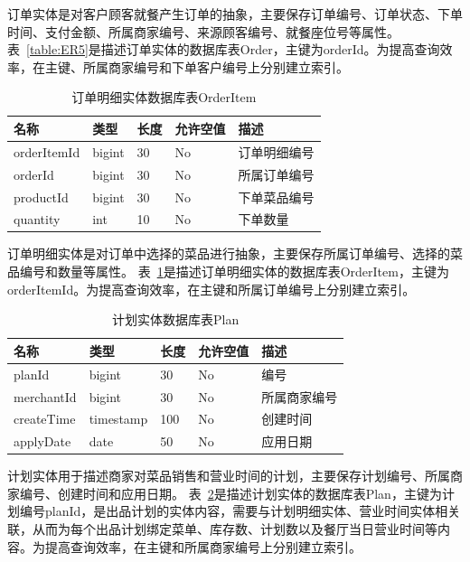 订单实体是对客户顾客就餐产生订单的抽象，主要保存订单编号、订单状态、下单时间、支付金额、所属商家编号、来源顾客编号、就餐座位号等属性。
表~\ref{table:ER5}是描述订单实体的数据库表Order，主键为orderId。为提高查询效率，在主键、所属商家编号和下单客户编号上分别建立索引。

\begin{table}[htbp!]\footnotesize
  \centering
  \caption{订单明细实体数据库表OrderItem}
  \vspace{2mm}
  \begin{tabular}{lllll}
  \toprule
  \textbf{名称}&\textbf{类型}&\textbf{长度}&\textbf{允许空值}&\textbf{描述}\\
  \midrule 
  orderItemId& bigint& 30& No& 订单明细编号\\
  \hline
  orderId& bigint& 30& No& 所属订单编号\\
  \hline
  productId& bigint& 30& No& 下单菜品编号\\
  \hline
  quantity& int& 10& No& 下单数量\\
  \bottomrule
  \end{tabular}
  \label{table:ER6}
\end{table}

订单明细实体是对订单中选择的菜品进行抽象，主要保存所属订单编号、选择的菜品编号和数量等属性。
表~\ref{table:ER6}是描述订单明细实体的数据库表OrderItem，主键为orderItemId。为提高查询效率，在主键和所属订单编号上分别建立索引。

\begin{table}[htbp!]\footnotesize
  \centering
  \caption{计划实体数据库表Plan}
  \vspace{2mm}
  \begin{tabular}{lllll}
  \toprule
  \textbf{名称}&\textbf{类型}&\textbf{长度}&\textbf{允许空值}&\textbf{描述}\\
  \midrule 
  planId& bigint& 30& No& 编号\\
  \hline
  merchantId& bigint& 30& No& 所属商家编号\\
  \hline
  createTime& timestamp& 100& No& 创建时间\\
  \hline
  applyDate& date& 50& No& 应用日期\\
  \bottomrule
  \end{tabular}
  \label{table:ER7}
\end{table}

计划实体用于描述商家对菜品销售和营业时间的计划，主要保存计划编号、所属商家编号、创建时间和应用日期。
表~\ref{table:ER7}是描述计划实体的数据库表Plan，主键为计划编号planId，是出品计划的实体内容，需要与计划明细实体、营业时间实体相关联，从而为每个出品计划绑定菜单、库存数、计划数以及餐厅当日营业时间等内容。为提高查询效率，在主键和所属商家编号上分别建立索引。

